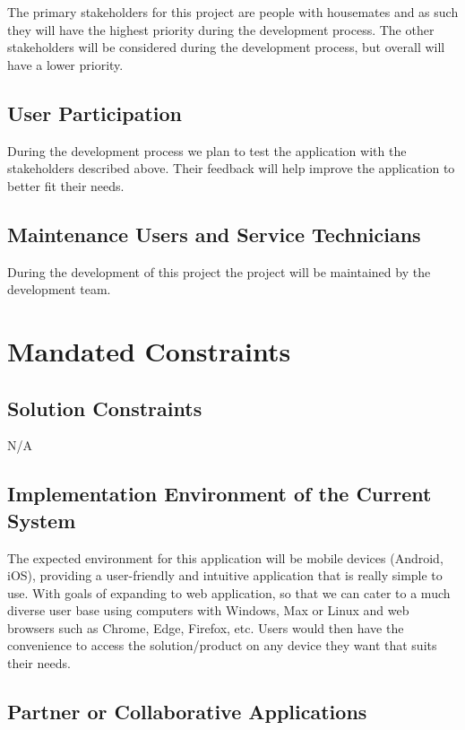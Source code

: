 \documentclass[12pt]{article}
\begin{document}
The primary stakeholders for this project are people with housemates and as such they will have the highest priority during the development process. The other stakeholders will be considered during the development process, but overall will have a lower priority.

\subsection{User Participation}

During the development process we plan to test the application with the stakeholders described above. Their feedback will help improve the application to better fit their needs.

\subsection{Maintenance Users and Service Technicians}

During the development of this project the project will be maintained by the development team.

\section{Mandated Constraints}
\subsection{Solution Constraints}

N/A

\subsection{Implementation Environment of the Current System}

The expected environment for this application will be mobile devices (Android, iOS), providing a user-friendly and intuitive application that is really simple to use. With goals of expanding to web application, so that we can cater to a much diverse user base using computers with Windows, Max or Linux and web browsers such as Chrome, Edge, Firefox, etc. Users would then have the convenience to access the solution/product on any device they want that suits their needs. 

\subsection{Partner or Collaborative Applications}
\end{document}
